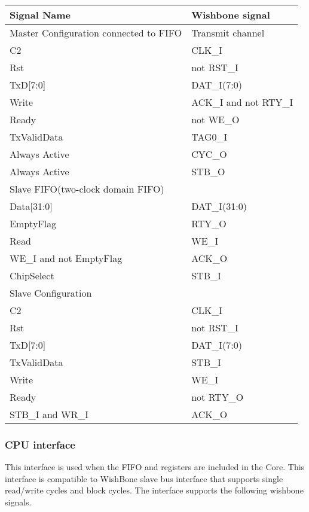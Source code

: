 \documentclass[a4paper,11pt]{article}
\begin{document}
\begin{tabular}{|l|l|}
\hline
Signal Name& Wishbone signal\\
\hline
\hline
Master Configuration connected to FIFO& Transmit channel\\
\hline
\hline
C2 & CLK\_I\\
Rst & not RST\_I\\
TxD[7:0]& DAT\_I(7:0)\\
Write& ACK\_I and not RTY\_I\\
Ready& not WE\_O\\
TxValidData& TAG0\_I\\
Always Active & CYC\_O\\
Always Active & STB\_O\\

\hline

Slave FIFO(two-clock domain FIFO)&\\
\hline
Data[31:0]& DAT\_I(31:0)\\
EmptyFlag& RTY\_O\\
Read& WE\_I\\
WE\_I and not EmptyFlag& ACK\_O\\
ChipSelect& STB\_I\\

\hline

Slave Configuration &\\
\hline
C2 & CLK\_I\\
Rst & not RST\_I\\
TxD[7:0]& DAT\_I(7:0)\\
TxValidData& STB\_I\\
Write&  WE\_I\\
Ready& not RTY\_O\\
STB\_I and WR\_I& ACK\_O\\
\hline

\end{tabular}



\subsubsection{CPU interface}
This interface is used when the FIFO and registers are included in the Core. This interface is compatible to WishBone slave bus interface that supports single read/write cycles and block cycles. The interface supports the following wishbone signals.
\end{document}
